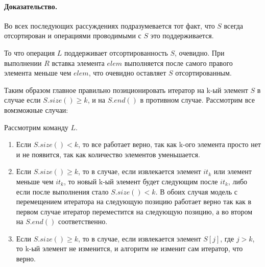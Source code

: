\documentclass[12pt]{article}
\begin{document}
\paragraph{Доказательство.}
Во всех последующих рассуждениях подразумевается тот факт, что $ S $ всегда
отсортирован и операциями проводимыми с $ S $ это поддерживается.

То что операция $ L $ поддерживает отсортированность $ S $, очевидно. При
выполнении $ R $ вставка элемента $ elem $ выполняется после самого
правого элемента меньше чем $ elem $, что очевидно оставляет $ S $
отсортированным.

Таким образом главное правильно позиционировать итератор на k-ый элемент
$ S $ в случае если $ S.size() \ge k $, и на $ S.end() $ в противном случае.
Рассмотрим все вомзможные случаи:

Рассмотрим команду $ L $.
\begin{enumerate}
    \item Если $ S.size() <  k $, то все работает верно, так как k-ого
          элемента просто нет и не появится, так как количество элементов
          уменьшается.
    \item Если $ S.size() \ge k $, то в случае, если извлекается элемент
          $ it_k $ или элемент меньше чем $ it_k $, то новый k-ый элемент
          будет следующим после $ it_k $, либо если после выполнения стало
          $ S.size() < k $. В обоих случая модель с перемещением итератора
          на следующую позицию работает верно так как в первом случае
          итератор переместится на следующую позицию, а во втором на
          $ S.end() $ соответственно.
    \item Если $ S.size() \ge k $, то в случае, если извлекается элемент
          $ S[j] $, где $ j > k $, то k-ый элемент не изменится, и алгоритм
          не изменит сам итератор, что верно.
\end{enumerate}
\end{document}
